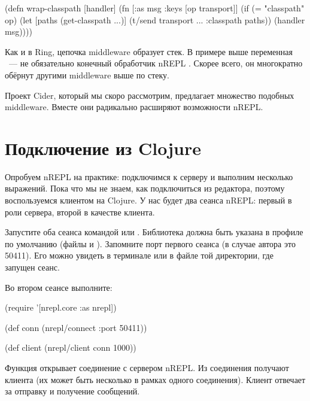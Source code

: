 \begin{english}
  \begin{clojure/lines}
(defn wrap-classpath
  [handler]
  (fn [{:as msg :keys [op transport]}]
    (if (= "classpath" op)
      (let [paths
            (get-classpath ...)]
        (t/send transport {... :classpath paths}))
      (handler msg))))
  \end{clojure/lines}
\end{english}

Как и в Ring, цепочка middleware образует стек. В примере выше переменная ~--- не обязательно конечный обработчик nREPL . Скорее всего, он многократно обёрнут другими middleware выше по стеку.

Проект Cider, который мы скоро рассмотрим, предлагает множество подобных middleware. Вместе они радикально расширяют возможности nREPL.

\section{Подключение из Clojure}


Опробуем nREPL на практике: подключимся к серверу и выполним несколько выражений. Пока что мы не знаем, как подключиться из редактора, поэтому воспользуемся клиентом на Clojure. У нас будет два сеанса nREPL: первый в роли сервера, второй в качестве клиента.

Запустите оба сеанса командой  или . Библиотека  должна быть указана в профиле по умолчанию (файлы  и ). Запомните порт первого сеанса (в случае автора это 50411). Его можно увидеть в терминале или в файле  той директории, где запущен сеанс.

Во втором сеансе выполните:

\begin{english}
  \begin{clojure}
(require '[nrepl.core :as nrepl])

(def conn
  (nrepl/connect :port 50411))

(def client
  (nrepl/client conn 1000))
  \end{clojure}
\end{english}

Функция  открывает соединение с сервером nREPL. Из соединения получают клиента (их может быть несколько в рамках одного соединения). Клиент отвечает за отправку и получение сообщений.

